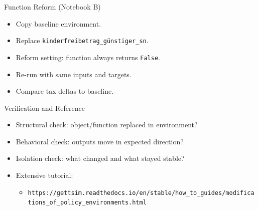 \documentclass[aspectratio=169]{beamer}
\begin{document}
\begin{frame}{Function Reform (Notebook B)}
  \begin{itemize}
    \item Copy baseline environment.
    \item Replace \texttt{kinderfreibetrag\_günstiger\_sn}.
    \item Reform setting: function always returns \texttt{False}.
    \item Re-run with same inputs and targets.
    \item Compare tax deltas to baseline.
  \end{itemize}
\end{frame}

\begin{frame}{Verification and Reference}
  \begin{itemize}
    \item Structural check: object/function replaced in environment?
    \item Behavioral check: outputs move in expected direction?
    \item Isolation check: what changed and what stayed stable?
    \item Extensive tutorial:
      \begin{itemize}
        \item \texttt{https://gettsim.readthedocs.io/en/stable/how\_to\_guides/modifications\_of\_policy\_environments.html}
      \end{itemize}
  \end{itemize}
\end{frame}
\end{document}
